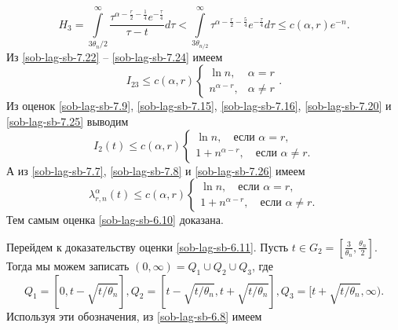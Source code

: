 \begin{equation}\label{sob-lag-sb-7.24}
H_3=\int\limits_{3\theta_n/2}^\infty\frac{\tau^{\alpha-\frac r 2- \frac 1 4}e^{-\frac \tau 4}}{\tau - t}d\tau<\int\limits_{3\theta_{n/2}}^\infty \tau^{\alpha-\frac r 2 - \frac 5 4}
e^{-\frac \tau 4}d\tau\le c(\alpha, r)e^{-n}.
\end{equation}
Из \eqref{sob-lag-sb-7.22} -- \eqref{sob-lag-sb-7.24} имеем
\begin{equation}\label {7.25}
I_{23}\le c(\alpha, r)\begin{cases}\ln n,&\text{$\alpha= r$}\\n^{\alpha - r},&\text{$\alpha\ne r$}
\end{cases}.
\end{equation}
Из  оценок \eqref{sob-lag-sb-7.9}, \eqref{sob-lag-sb-7.15}, \eqref{sob-lag-sb-7.16},  \eqref{sob-lag-sb-7.20}  и   \eqref{sob-lag-sb-7.25} выводим
\begin{equation} \label{sob-lag-sb-7.26}
I_2(t)\le c(\alpha, r)
\left\{
\begin{aligned}
\ln n, \quad \mbox{если } \alpha = r,\\
1+n^{\alpha - r},\quad \mbox{если }\alpha \not= r.
\end{aligned}
\right.
\end{equation}
А из \eqref{sob-lag-sb-7.7}, \eqref{sob-lag-sb-7.8} и \eqref{sob-lag-sb-7.26} имеем
$$
\lambda_{r,n}^{\alpha}(t)\le c(\alpha, r)
\left\{
\begin{aligned}
\ln n, \quad \mbox{если } \alpha = r,\\
1+n^{\alpha - r},\quad \mbox{если }\alpha \not= r.
\end{aligned}
\right.
$$
Тем самым оценка \eqref{sob-lag-sb-6.10} доказана.

Перейдем к доказательству оценки \eqref{sob-lag-sb-6.11}. Пусть $t\in G_2=\left[\frac{3}{\theta_n},\frac{\theta_n}{2}\right]$. Тогда мы можем записать
$(0,\infty)=Q_1\cup Q_2\cup Q_3$, где
$$
Q_1=[0,t-\sqrt{t/\theta_n}], Q_2=[t-\sqrt{t/\theta_n},t+\sqrt{t/\theta_n}], Q_3=[t+\sqrt{t/\theta_n},\infty).
$$
Используя эти обозначения, из \eqref{sob-lag-sb-6.8} имеем

